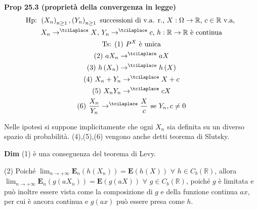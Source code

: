 \documentclass{article}
\begin{document}
\textbf{Prop 25.3 (propriet\`{a} della convergenza in legge)}%
\begin{gather*}
\text{Hp: }\left( X_{n}\right) _{n\geq 1},\left( Y_{n}\right) _{n\geq 1}%
\text{ successioni di v.a. r., }X:\Omega \rightarrow 
\mathbb{R}
\text{, }c\in 
\mathbb{R}
\text{ v.a, } \\
X_{n}\rightarrow ^{\tciLaplace }X\text{, }Y_{n}\rightarrow ^{\tciLaplace }c%
\text{, }h:%
\mathbb{R}
\rightarrow 
\mathbb{R}
\text{ \`{e} continua} \\
\text{Ts: (1) }P^{X}\text{ \`{e} unica} \\
\text{(2) }aX_{n}\rightarrow ^{\tciLaplace }aX \\
\text{(3) }h\left( X_{n}\right) \rightarrow ^{\tciLaplace }h\left( X\right)
\\
\text{(4) }X_{n}+Y_{n}\rightarrow ^{\tciLaplace }X+c \\
\text{(5) }X_{n}Y_{n}\rightarrow ^{\tciLaplace }cX \\
\text{(6) }\frac{X_{n}}{Y_{n}}\rightarrow ^{\tciLaplace }\frac{X}{c}\text{
se }Y_{n},c\neq 0
\end{gather*}

Nelle ipotesi si suppone implicitamente che ogni $X_{n}$ sia definita su un
diverso spazio di probabilit\`{a}. (4),(5),(6) vengono anche detti teorema di
Slutsky.

\textbf{Dim} (1) \`{e} una conseguenza del teorema di Levy.

(2) Poich\'{e} $\lim_{n\rightarrow +\infty }\mathbf{E}_{n}\left( h\left(
X_{n}\right) \right) =\mathbf{E}\left( h\left( X\right) \right) $ $\forall $ 
$h\in C_{b}\left( 
\mathbb{R}
\right) $, allora $\lim_{n\rightarrow +\infty }\mathbf{E}_{n}\left( g\left(
aX_{n}\right) \right) =\mathbf{E}\left( g\left( aX\right) \right) $ $\forall 
$ $g\in C_{b}\left( 
\mathbb{R}
\right) $, poich\'{e} $g$ \`{e} limitata e pu\`{o} inoltre essere vista come
la composizione di $g$ e della funzione continua $ax$, per cui \`{e} ancora
continua e $g\left( ax\right) $ pu\`{o} essere presa come $h$.
\end{document}
